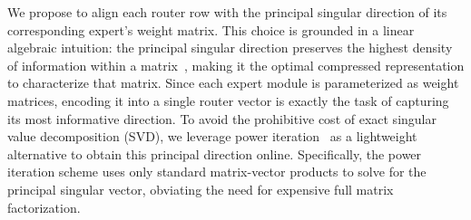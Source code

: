 \documentclass[11pt]{article}
\begin{document}


We propose to align each router row with the principal singular direction of its corresponding expert's weight matrix. 
This choice is grounded in a linear algebraic intuition: the principal singular direction preserves the highest density of information within a matrix~\cite{matrixcomputation,power}, making it the optimal compressed representation to characterize that matrix. 
Since each expert module is parameterized as weight matrices, encoding it into a single router vector is exactly the task of capturing its most informative direction.
To avoid the prohibitive cost of exact singular value decomposition (SVD), we leverage power iteration~\cite{power} as a lightweight alternative to obtain this principal direction online.
Specifically, the power iteration scheme uses only standard matrix-vector products to solve for the principal singular vector, obviating the need for expensive full matrix factorization.
\end{document}
